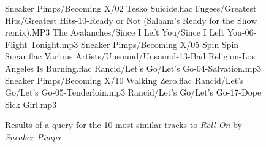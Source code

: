 \begin{figure}[p]
	\caption{Results of a query for the 10 most similar tracks to \emph{Roll On} by \emph{Sneaker Pimps}}
	\label{fig:testing:user:similarity:a}
	\begin{listing}{1}
Sneaker Pimps/Becoming X/02 Tesko Suicide.flac
Fugees/Greatest Hits/Greatest Hits-10-Ready or Not (Salaam's Ready for the Show remix).MP3
The Avalanches/Since I Left You/Since I Left You-06-Flight Tonight.mp3
Sneaker Pimps/Becoming X/05 Spin Spin Sugar.flac
Various Artists/Unsound/Unsound-13-Bad Religion-Los Angeles Is Burning.flac
Rancid/Let's Go/Let's Go-04-Salvation.mp3
Sneaker Pimps/Becoming X/10 Walking Zero.flac
Rancid/Let's Go/Let's Go-05-Tenderloin.mp3
Rancid/Let's Go/Let's Go-17-Dope Sick Girl.mp3
\end{listing}
\end{figure}
